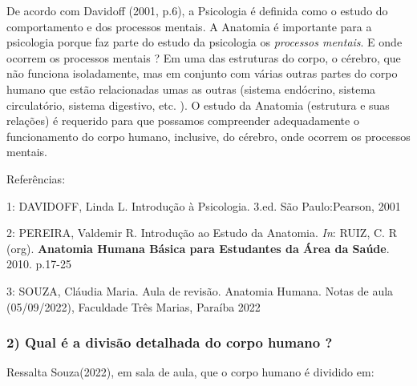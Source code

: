 \documentclass[
]{book}
\begin{document}
De acordo com Davidoff (2001, p.6), a Psicologia é definida como o estudo do comportamento e dos processos mentais. A Anatomia é importante para a psicologia porque faz parte do estudo da psicologia os \emph{processos mentais}. E onde ocorrem os processos mentais ? Em uma das estruturas do corpo, o cérebro, que não funciona isoladamente, mas em conjunto com várias outras partes do corpo humano que estão relacionadas umas as outras (sistema endócrino, sistema circulatório, sistema digestivo, etc. ). O estudo da Anatomia (estrutura e suas relações) é requerido para que possamos compreender adequadamente o funcionamento do corpo humano, inclusive, do cérebro, onde ocorrem os processos mentais.

Referências:

1: DAVIDOFF, Linda L. Introdução à Psicologia. 3.ed. São Paulo:Pearson, 2001

2: PEREIRA, Valdemir R. Introdução ao Estudo da Anatomia. \emph{In}: RUIZ, C. R (org). \textbf{Anatomia Humana Básica para Estudantes da Área da Saúde}. 2010. p.17-25

3: SOUZA, Cláudia Maria. Aula de revisão. Anatomia Humana. Notas de aula (05/09/2022), Faculdade Três Marias, Paraíba 2022

\hypertarget{qual-uxe9-a-divisuxe3o-detalhada-do-corpo-humano}{%
\subsubsection*{2) Qual é a divisão detalhada do corpo humano ?}\label{qual-uxe9-a-divisuxe3o-detalhada-do-corpo-humano}}

Ressalta Souza(2022), em sala de aula, que o corpo humano é dividido em:
\end{document}
